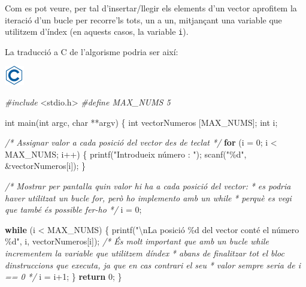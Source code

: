 \documentclass[
]{book}
\newenvironment{Shaded}{\begin{snugshade}}{\end{snugshade}}
\newcommand{\CommentTok}[1]{\textcolor[rgb]{0.56,0.35,0.01}{\textit{#1}}}
\newcommand{\ControlFlowTok}[1]{\textcolor[rgb]{0.13,0.29,0.53}{\textbf{#1}}}
\newcommand{\DataTypeTok}[1]{\textcolor[rgb]{0.13,0.29,0.53}{#1}}
\newcommand{\DecValTok}[1]{\textcolor[rgb]{0.00,0.00,0.81}{#1}}
\newcommand{\ImportTok}[1]{#1}
\newcommand{\NormalTok}[1]{#1}
\newcommand{\PreprocessorTok}[1]{\textcolor[rgb]{0.56,0.35,0.01}{\textit{#1}}}
\newcommand{\SpecialCharTok}[1]{\textcolor[rgb]{0.00,0.00,0.00}{#1}}
\newcommand{\StringTok}[1]{\textcolor[rgb]{0.31,0.60,0.02}{#1}}
\begin{document}
Com es pot veure, per tal d'insertar/llegir els elements d'un vector aprofitem la iteració d'un bucle per recorre'ls tots, un a un, mitjançant una variable que utilitzem d'índex (en aquests casos, la variable \texttt{i}).

La traducció a C de l'algorisme podria ser així:

\includegraphics{./img/c.png}

\begin{Shaded}
\begin{Highlighting}[]
\PreprocessorTok{\#include }\ImportTok{\textless{}stdio.h\textgreater{}}
\PreprocessorTok{\#define MAX\_NUMS 5}

\DataTypeTok{int}\NormalTok{ main(}\DataTypeTok{int}\NormalTok{ argc, }\DataTypeTok{char}\NormalTok{ **argv) \{}
    \DataTypeTok{int}\NormalTok{ vectorNumeros [MAX\_NUMS];}
    \DataTypeTok{int}\NormalTok{ i;}

    \CommentTok{/* Assignar valor a cada posició del vector des de teclat */}
    \ControlFlowTok{for}\NormalTok{ (i = }\DecValTok{0}\NormalTok{; i \textless{} MAX\_NUMS; i++) \{}
\NormalTok{        printf(}\StringTok{"Introdueix número : "}\NormalTok{);}
\NormalTok{        scanf(}\StringTok{"\%d"}\NormalTok{, \&vectorNumeros[i]);}
\NormalTok{    \}}

    \CommentTok{/* Mostrar per pantalla quin valor hi ha a cada posició del vector:}
\CommentTok{     * es podria haver utilitzat un bucle for, però ho implemento amb un while}
\CommentTok{     * perquè es vegi que també és possible fer{-}ho }
\CommentTok{     */}
\NormalTok{    i = }\DecValTok{0}\NormalTok{;}

    \ControlFlowTok{while}\NormalTok{ (i \textless{} MAX\_NUMS) \{}
\NormalTok{        printf(}\StringTok{"}\SpecialCharTok{\textbackslash{}n}\StringTok{La posició \%d del vector conté el número \%d"}\NormalTok{, i, vectorNumeros[i]);}
        \CommentTok{/* És molt important que amb un bucle while incrementem la variable que utilitzem d\textquotesingle{}índex}
\CommentTok{         * abans de finalitzar tot el bloc d\textquotesingle{}instruccions que executa, ja que en cas contrari el seu}
\CommentTok{         * valor sempre seria de i == 0 }
\CommentTok{         */}
\NormalTok{        i = i+}\DecValTok{1}\NormalTok{;}
\NormalTok{    \}}
    \ControlFlowTok{return} \DecValTok{0}\NormalTok{;}
\NormalTok{\}}
\end{Highlighting}
\end{Shaded}
\end{document}
